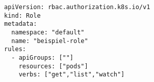 \begin{verbatim}
apiVersion: rbac.authorization.k8s.io/v1
kind: Role
metadata:
  namespace: "default"
  name: "beispiel-role"
rules:
  - apiGroups: [""]
    resources: ["pods"]
    verbs: ["get","list","watch"]
\end{verbatim}
